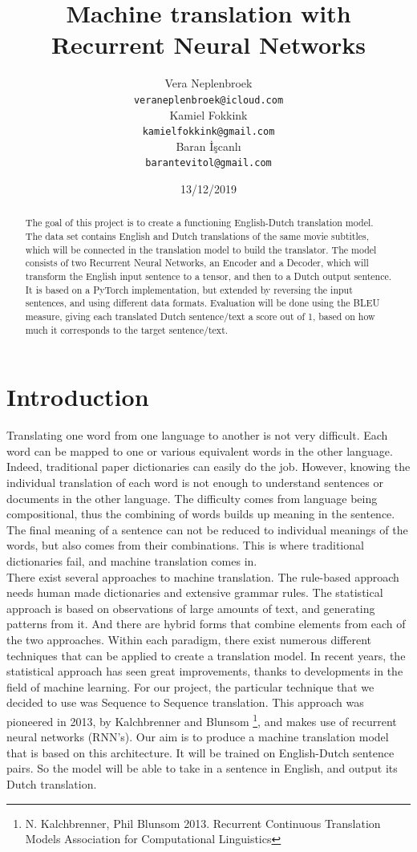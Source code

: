 \documentclass[11pt]{article}
\title{{\LARGE Machine translation with Recurrent Neural Networks}}
\author{Vera Neplenbroek \\
  {\tt veraneplenbroek@icloud.com} \\\And
  Kamiel Fokkink \\
  {\tt kamielfokkink@gmail.com} \\\And
Baran İşcanlı \\
{\tt barantevitol@gmail.com} \\}
\date{13/12/2019}
\begin{document}
\maketitle
\begin{abstract}
  The goal of this project is to create a functioning English-Dutch
  translation model. The data set contains English and Dutch
  translations of the same movie subtitles, which will be connected
  in the translation model to build the translator. The model
  consists of two Recurrent Neural Networks, an Encoder and a Decoder,
  which will transform the English input sentence to a tensor, and
  then to a Dutch output sentence. It is based on a PyTorch
  implementation, but extended by reversing the input sentences, and
  using different data formats. Evaluation will be done using the
  BLEU measure, giving each translated Dutch sentence/text a score
  out of 1, based on how much it corresponds to the target sentence/text.
\end{abstract}

\section{Introduction}

Translating one word from one language to another is not very difficult. Each word can be mapped to one or various equivalent words in the other language. Indeed, traditional paper dictionaries can easily do the job. However, knowing the individual translation of each word is not enough to understand sentences or documents in the other language. The difficulty comes from language being compositional, thus the combining of words builds up meaning in the sentence. The final meaning of a sentence can not be reduced to individual meanings of the words, but also comes from their combinations. This is where traditional dictionaries fail, and machine translation comes in.\\

There exist several approaches to machine translation. The rule-based approach needs human made dictionaries and extensive grammar rules. The statistical approach is based on observations of large amounts of text, and generating patterns from it. And there are hybrid forms that combine elements from each of the two approaches. Within each paradigm, there exist numerous different techniques that can be applied to create a translation model. In recent years, the statistical approach has seen great improvements, thanks to developments in the field of machine learning. For our project, the particular technique that we decided to use was Sequence to Sequence translation. This approach was pioneered in 2013, by Kalchbrenner and Blunsom \footnote[1]{N. Kalchbrenner, Phil Blunsom 2013. Recurrent Continuous Translation Models Association for Computational Linguistics}, and makes use of recurrent neural networks (RNN’s). Our aim is to produce a machine translation model that is based on this architecture. It will be trained on English-Dutch sentence pairs. So the model will be able to take in a sentence in English, and output its Dutch translation.
\end{document}

